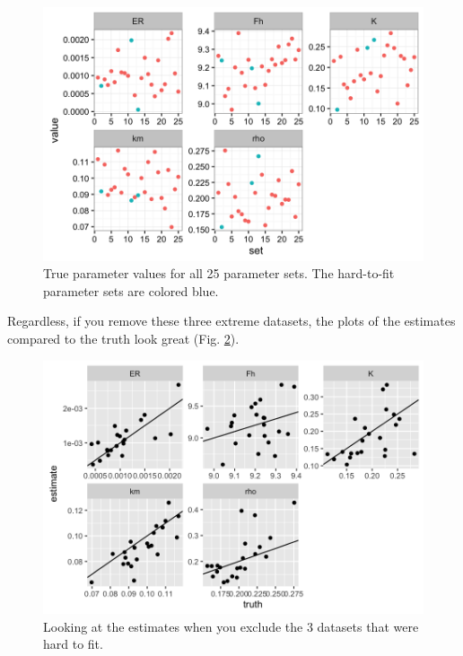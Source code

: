 \documentclass[12pt,reqno,final,pdftex]{amsart}\usepackage[]{graphicx}\usepackage[]{color}
\newenvironment{knitrout}{}{} %
\theoremstyle{plain}
\numberwithin{equation}{part}
\begin{document}
\begin{knitrout}\scriptsize
{}\color{fgcolor}\begin{figure}

\includegraphics[width=\linewidth]{figure/comparing-parameters-1} \hfill{}

\caption[True parameter values for all 25 parameter sets]{True parameter values for all 25 parameter sets. The hard-to-fit parameter sets are colored blue.}\label{fig:comparing-parameters}
\end{figure}


\end{knitrout}

\clearpage

Regardless, if you remove these three extreme datasets, the plots of the estimates compared to the truth look great (Fig. \ref{fig:best-estimates}).
\begin{knitrout}\scriptsize
{}\color{fgcolor}\begin{figure}

\includegraphics[width=\linewidth]{figure/best-estimates-1} \hfill{}

\caption[Looking at the estimates when you exclude the 3 datasets that were hard to fit]{Looking at the estimates when you exclude the 3 datasets that were hard to fit.}\label{fig:best-estimates}
\end{figure}


\end{knitrout}
\end{document}
